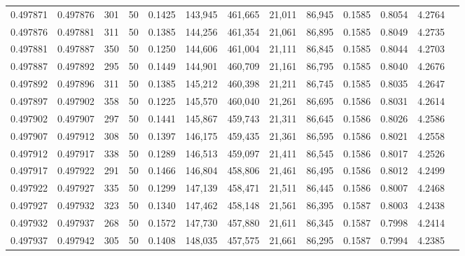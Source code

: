 \begin{tabular}{rrrrrrrrrrrrr}
0.497871 & 0.497876 & 301 &  50 &                                     0.1425 & 143,945 & 461,665 &  21,011 &  86,945 & 0.1585 & 0.8054 & 4.2764 \\
0.497876 & 0.497881 & 311 &  50 &                                     0.1385 & 144,256 & 461,354 &  21,061 &  86,895 & 0.1585 & 0.8049 & 4.2735 \\
0.497881 & 0.497887 & 350 &  50 &                                     0.1250 & 144,606 & 461,004 &  21,111 &  86,845 & 0.1585 & 0.8044 & 4.2703 \\
0.497887 & 0.497892 & 295 &  50 &                                     0.1449 & 144,901 & 460,709 &  21,161 &  86,795 & 0.1585 & 0.8040 & 4.2676 \\
0.497892 & 0.497896 & 311 &  50 &                                     0.1385 & 145,212 & 460,398 &  21,211 &  86,745 & 0.1585 & 0.8035 & 4.2647 \\
0.497897 & 0.497902 & 358 &  50 &                                     0.1225 & 145,570 & 460,040 &  21,261 &  86,695 & 0.1586 & 0.8031 & 4.2614 \\
0.497902 & 0.497907 & 297 &  50 &                                     0.1441 & 145,867 & 459,743 &  21,311 &  86,645 & 0.1586 & 0.8026 & 4.2586 \\
0.497907 & 0.497912 & 308 &  50 &                                     0.1397 & 146,175 & 459,435 &  21,361 &  86,595 & 0.1586 & 0.8021 & 4.2558 \\
0.497912 & 0.497917 & 338 &  50 &                                     0.1289 & 146,513 & 459,097 &  21,411 &  86,545 & 0.1586 & 0.8017 & 4.2526 \\
0.497917 & 0.497922 & 291 &  50 &                                     0.1466 & 146,804 & 458,806 &  21,461 &  86,495 & 0.1586 & 0.8012 & 4.2499 \\
0.497922 & 0.497927 & 335 &  50 &                                     0.1299 & 147,139 & 458,471 &  21,511 &  86,445 & 0.1586 & 0.8007 & 4.2468 \\
0.497927 & 0.497932 & 323 &  50 &                                     0.1340 & 147,462 & 458,148 &  21,561 &  86,395 & 0.1587 & 0.8003 & 4.2438 \\
0.497932 & 0.497937 & 268 &  50 &                                     0.1572 & 147,730 & 457,880 &  21,611 &  86,345 & 0.1587 & 0.7998 & 4.2414 \\
0.497937 & 0.497942 & 305 &  50 &                                     0.1408 & 148,035 & 457,575 &  21,661 &  86,295 & 0.1587 & 0.7994 & 4.2385 \\

\end{tabular}
